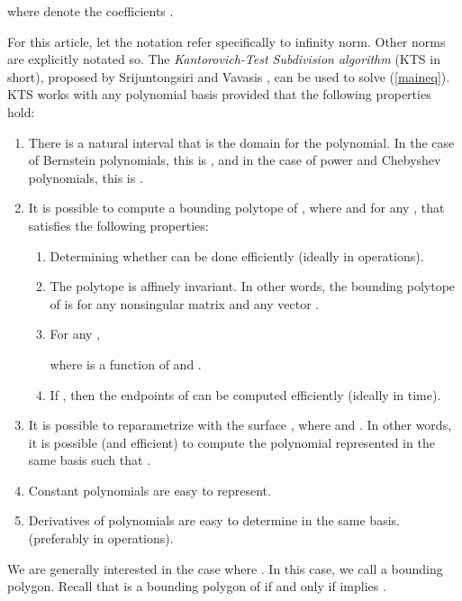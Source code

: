 \documentclass[12pt]{article}
\begin{document}
where   denote the coefficients \cite{srijuntongsiri_lsi}.

For this article, let the
notation  refer specifically to infinity
norm.  Other norms are explicitly notated so.
The \emph{Kantorovich-Test Subdivision algorithm} (KTS
in short), proposed by Srijuntongsiri and Vavasis \cite{srijuntongsiri_lsi},
can be used to solve (\ref{maineq}).
KTS works with any polynomial basis 
provided that the following properties hold:
\begin{enumerate}
\item There is a natural interval  that is the domain for the polynomial.
In the case of Bernstein polynomials, this is , and in the case of power and
Chebyshev polynomials, this is .

\item It is possible to compute a bounding polytope  of , where  and  for any , that satisfies the following
properties: \label{bounding_prop}
\begin{enumerate}
\item Determining whether  can be done efficiently
(ideally in  operations).

\item The polytope  is affinely invariant. In other words,
the bounding polytope of 
 is  for any nonsingular matrix
 and any vector .

\item For any ,

where  is a function of  and .
\label{prop_theta}

\item If , then the endpoints of  can be computed efficiently (ideally in  time).
\label{prop_endpoint}
\end{enumerate}

\item It is possible to reparametrize with  the surface
, where  and .
In other words, it is possible (and efficient) to compute the polynomial
 represented in the same basis such that .

\item Constant polynomials are easy to represent. \label{constant_poly_easy}

\item Derivatives of polynomials are easy to determine in the same basis. (preferably in  operations).
\label{prop_deriv}
\end{enumerate}
We are generally interested in the case where .  In this case, we call  a bounding polygon.  Recall that 
is a bounding polygon of  if and only if  implies .
\end{document}
